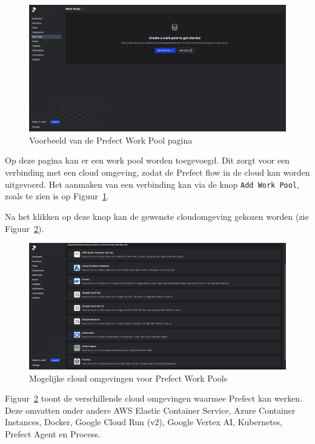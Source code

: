 \begin{figure}
    \centering
    \includegraphics[width=0.9\linewidth]{graphics/Prefect_Work_Pools.PNG}
    \caption{Voorbeeld van de Prefect Work Pool pagina}
    \label{fig:Prefect_Work_Pools}
\end{figure}

Op deze pagina kan er een work pool worden toegevoegd. Dit zorgt voor een verbinding met een cloud omgeving, zodat de Prefect flow in de cloud kan worden uitgevoerd. Het aanmaken van een verbinding kan via de knop \texttt{Add Work Pool}, zoals te zien is op Figuur~\ref{fig:Prefect_Work_Pools}.

Na het klikken op deze knop kan de gewenste cloudomgeving gekozen worden (zie Figuur~\ref{fig:Prefect_Work_Pools_Create}).

\begin{figure}
    \centering
    \includegraphics[width=0.9\linewidth]{graphics/Prefect_Work_Pools_Create.PNG}
    \caption{Mogelijke cloud omgevingen voor Prefect Work Pools}
    \label{fig:Prefect_Work_Pools_Create}
\end{figure}

Figuur~\ref{fig:Prefect_Work_Pools_Create} toont de verschillende cloud omgevingen waarmee Prefect kan werken. Deze omvatten onder andere AWS Elastic Container Service, Azure Container Instances, Docker, Google Cloud Run (v2), Google Vertex AI, Kubernetes, Prefect Agent en Process.

